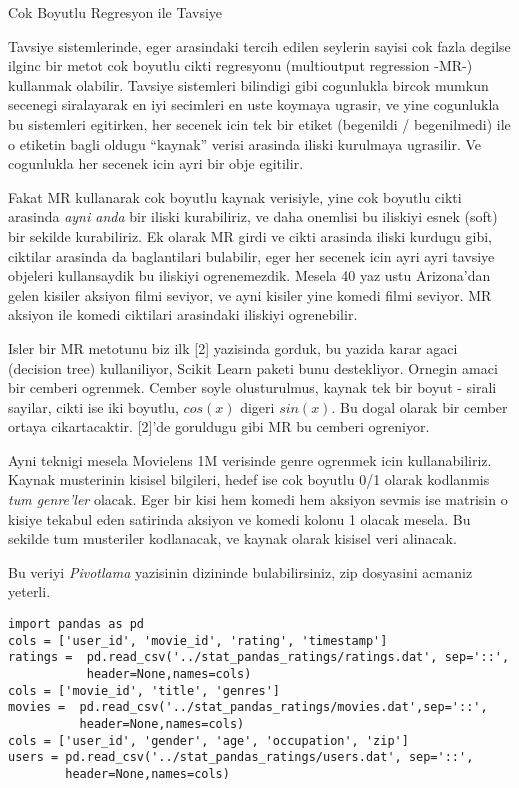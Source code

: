 \documentclass[12pt,fleqn]{article}\usepackage{../common}
\begin{document}
Cok Boyutlu Regresyon ile Tavsiye

Tavsiye sistemlerinde, eger arasindaki tercih edilen seylerin sayisi cok
fazla degilse ilginc bir metot cok boyutlu cikti regresyonu (multioutput
regression -MR-) kullanmak olabilir. Tavsiye sistemleri bilindigi gibi
cogunlukla bircok mumkun secenegi siralayarak en iyi secimleri en uste
koymaya ugrasir, ve yine cogunlukla bu sistemleri egitirken, her secenek
icin tek bir etiket (begenildi / begenilmedi) ile o etiketin bagli oldugu
``kaynak'' verisi arasinda iliski kurulmaya ugrasilir. Ve cogunlukla her
secenek icin ayri bir obje egitilir. 

Fakat MR kullanarak cok boyutlu kaynak verisiyle, yine cok boyutlu cikti
arasinda {\em ayni anda} bir iliski kurabiliriz, ve daha onemlisi bu
iliskiyi esnek (soft) bir sekilde kurabiliriz. Ek olarak MR girdi ve cikti
arasinda iliski kurdugu gibi, ciktilar arasinda da baglantilari bulabilir,
eger her secenek icin ayri ayri tavsiye objeleri kullansaydik bu iliskiyi
ogrenemezdik. Mesela 40 yaz ustu Arizona'dan gelen kisiler aksiyon filmi
seviyor, ve ayni kisiler yine komedi filmi seviyor. MR aksiyon ile komedi
ciktilari arasindaki iliskiyi ogrenebilir.

Isler bir MR metotunu biz ilk [2] yazisinda gorduk, bu yazida karar agaci
(decision tree) kullaniliyor, Scikit Learn paketi bunu destekliyor. Ornegin
amaci bir cemberi ogrenmek. Cember soyle olusturulmus, kaynak tek bir boyut
- sirali sayilar, cikti ise iki boyutlu, $cos(x)$ digeri $sin(x)$. Bu dogal
olarak bir cember ortaya cikartacaktir. [2]'de goruldugu gibi MR bu cemberi
ogreniyor.

Ayni teknigi mesela Movielens 1M verisinde genre ogrenmek icin
kullanabiliriz. Kaynak musterinin kisisel bilgileri, hedef ise cok boyutlu
0/1 olarak kodlanmis {\em tum genre'ler} olacak. Eger bir kisi hem komedi
hem aksiyon sevmis ise matrisin o kisiye tekabul eden satirinda aksiyon ve
komedi kolonu 1 olacak mesela. Bu sekilde tum musteriler kodlanacak, ve
kaynak olarak kisisel veri alinacak. 

Bu veriyi {\em Pivotlama} yazisinin dizininde bulabilirsiniz, zip dosyasini
acmaniz yeterli. 

\begin{verbatim}
import pandas as pd
cols = ['user_id', 'movie_id', 'rating', 'timestamp']
ratings =  pd.read_csv('../stat_pandas_ratings/ratings.dat', sep='::',
           header=None,names=cols)
cols = ['movie_id', 'title', 'genres']
movies =  pd.read_csv('../stat_pandas_ratings/movies.dat',sep='::',
          header=None,names=cols)
cols = ['user_id', 'gender', 'age', 'occupation', 'zip']
users = pd.read_csv('../stat_pandas_ratings/users.dat', sep='::', 
        header=None,names=cols)
\end{verbatim}
\end{document}

